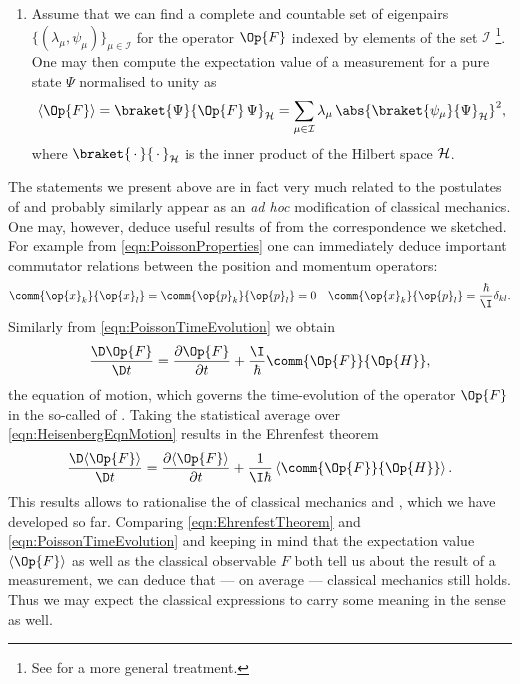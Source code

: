 \begin{enumerate}
	\item Assume that we can find a complete and countable
		set of eigenpairs $\{ (\lambda_\mu, \psi_\mu) \}_{\mu \in \mathcal{I}}$
		for the operator $\Op{F}$
		indexed by elements of the set $\mathcal{I}$%
		\footnote{See \cite{Helffer2013} for a more general treatment.}.
		One may then compute the expectation value of a measurement
		for a pure state $\Psi$ normalised to unity as
		\begin{equation}
			\langle \Op{F} \rangle
				= \braket{\Psi}{\Op{F} \, \Psi}_\hilbert
				= \sum_{\mu\in\mathcal{I}} \lambda_\mu \,
							\abs{\braket{\psi_\mu}{\Psi}_\hilbert}^2,
			\label{eqn:QMExpectation}
		\end{equation}
		where $\braket{\slot}{\slot}_\hilbert$ is the inner product
		of the Hilbert space $\mathcal{H}$.
\end{enumerate}
The statements we present above are in fact very much related
to the postulates of \QM and probably similarly appear as
an \textit{ad hoc} modification of classical mechanics.
One may, however, deduce useful results of \QM from the correspondence
we sketched.
For example from \eqref{eqn:PoissonProperties} one can immediately
deduce important commutator relations between the position and momentum operators:
\begin{align}
	\comm{\op{x}_k}{\op{x}_l} &= \comm{\op{p}_k}{\op{p}_l} = 0 & \comm{\op{x}_k}{\op{p}_l} = \frac{\hbar}{\I} \delta_{kl}.
	\label{eqn:compatibilityOperator}
\end{align}
Similarly from \eqref{eqn:PoissonTimeEvolution} we obtain
\begin{equation}
	\frac{\D \Op{F}}{\D t} = \frac{\partial \Op{F}}{\partial t} + \frac{\I}{\hbar} \comm{\Op{F}}{\Op{H}},
	\label{eqn:HeisenbergEqnMotion}
\end{equation}
the equation of motion, which governs the time-evolution of the operator $\Op{F}$
in the so-called  of \QM.
Taking the statistical average over \eqref{eqn:HeisenbergEqnMotion}
results in the Ehrenfest theorem
\begin{equation}
	\frac{\D \langle \Op{F} \rangle}{\D t} = \frac{\partial \langle \Op{F} \rangle}{\partial t} + \frac{1}{\I \hbar} \left\langle \comm{\Op{F}}{\Op{H}} \right\rangle.
	\label{eqn:EhrenfestTheorem}
\end{equation}
This results allows to rationalise the 
of classical mechanics and \QM,
which we have developed so far.
Comparing \eqref{eqn:EhrenfestTheorem} and \eqref{eqn:PoissonTimeEvolution}
and keeping in mind that the expectation value $\langle \Op{F} \rangle$
as well as the classical observable $F$ both tell us about the result
of a measurement,
we can deduce that --- on average --- classical mechanics still holds.
Thus we may expect the classical expressions to carry some meaning
in the \QM sense as well.

